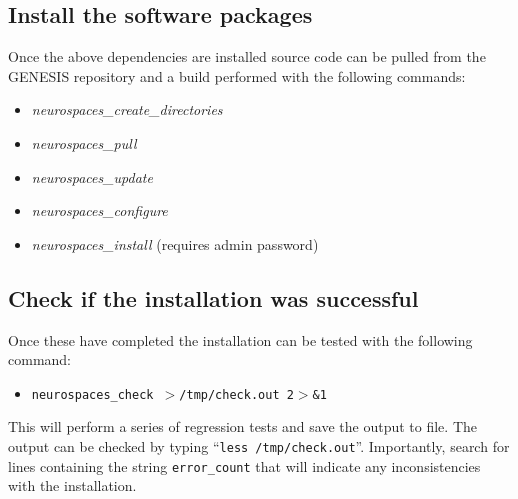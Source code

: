 \documentclass[12pt]{article}
\begin{document}
\subsection*{Install the software packages}

Once the above dependencies are installed source code can be pulled from the GENESIS repository and a build performed with the following commands:
\begin{itemize}
   \item[]{\it neurospaces\_create\_directories}
   \item[]{\it neurospaces\_pull}
   \item[]{\it neurospaces\_update}
   \item[]{\it neurospaces\_configure}
   \item[]{\it neurospaces\_install} (requires admin password) 
\end{itemize}

\subsection*{Check if the installation was successful}

Once these have completed the installation can be tested with the following command:
\begin{itemize}
   \item[]{\tt neurospaces\_check $>$/tmp/check.out 2$>$\&1}
\end{itemize}
This will perform a series of regression tests and save the output to file. The output can be checked by typing ``{\tt less /tmp/check.out}''. Importantly, search for lines containing the string {\tt error\_count} that will indicate any inconsistencies with the installation.
\end{document}
